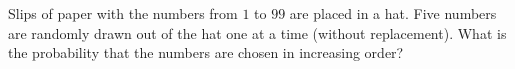 Slips of paper with the numbers from $1$ to $99$ are placed in a hat.
Five numbers are randomly drawn out of the hat one at a time (without replacement).
What is the probability that the numbers are chosen in increasing order?